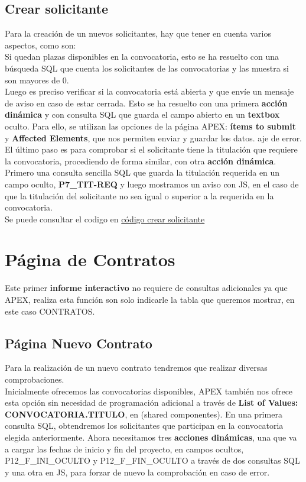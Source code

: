 \subsection{Crear solicitante}
Para la creación de un nuevos solicitantes, hay que tener en cuenta varios aspectos, como son:\\
Si quedan plazas disponibles en la convocatoria, esto se ha resuelto con una búsqueda \acrshort{SQL} que cuenta los solicitantes de las convocatorias y las muestra si son mayores de 0.\\
Luego es preciso verificar si la convocatoria está abierta y que envíe un mensaje de aviso en caso de estar cerrada. Esto se ha resuelto con una primera \textbf{acción dinámica} y con consulta \acrshort{SQL} que guarda el campo abierto en un \textbf{textbox} oculto. Para ello, se utilizan las opciones de la página \acrshort{APEX}: \textbf{ítems to submit} y \textbf{Affected Elements}, que nos permiten enviar y guardar los datos.
aje de error.\\
El último paso es para comprobar si el solicitante tiene la titulación que 	requiere la convocatoria, procediendo de forma similar, con otra \textbf{acción dinámica}. Primero una consulta sencilla \acrshort{SQL} que guarda la titulación requerida en un campo oculto, \textbf{\textbf{P7\_TIT-REQ}} y luego mostramos un aviso con \acrshort{JS}, en el caso de que la titulación del solicitante no sea igual o superior a la requerida en la convocatoria.\\
Se puede consultar el codigo en \href{https://github.com/far0010/TFGUBU-Fran_Arroyo/project-docs/memoria/sql
	/consultas_solicitante.sql}{código crear solicitante}

\section{Página de Contratos}
Este primer \textbf{informe interactivo} no requiere de consultas adicionales ya que \acrshort{APEX}, realiza esta función son solo indicarle la tabla que queremos mostrar, en este caso CONTRATOS.
\subsection{Página Nuevo Contrato}
Para la realización de un nuevo contrato tendremos que realizar diversas comprobaciones.\\ Inicialmente ofrecemos las convocatorias disponibles, \acrshort{APEX} también nos ofrece esta opción sin necesidad de programación adicional a través de \textbf{List of Values: CONVOCATORIA.TITULO}, en  (shared componentes).
En una primera consulta \acrshort{SQL}, obtendremos los solicitantes que participan en la convocatoria elegida anteriormente.
Ahora necesitamos tres \textbf{acciones dinámicas}, una que va a cargar las fechas de inicio y fin del proyecto, en campos ocultos, P12\_F\_INI\_OCULTO y P12\_F\_FIN\_OCULTO  a través de dos consultas \acrshort{SQL} y una otra en \acrshort{JS}, para forzar de nuevo la comprobación en caso de error.

